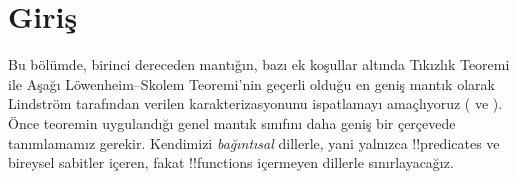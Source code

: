 \documentclass[../../../include/open-logic-section]{subfiles}
\begin{document}
\section{Giriş}

Bu bölümde, birinci dereceden mantığın, bazı ek koşullar altında Tıkızlık
Teoremi ile Aşağı L\"owenheim--Skolem Teoremi'nin geçerli olduğu en geniş
mantık olarak Lindstr\"om tarafından verilen karakterizasyonunu ispatlamayı
amaçlıyoruz ( ve
). Önce teoremin uygulandığı genel
mantık sınıfını daha geniş bir çerçevede tanımlamamız gerekir. Kendimizi
\emph{bağıntısal} dillerle, yani yalnızca !!{predicate}s ve bireysel sabitler
içeren, fakat !!{function}s içermeyen dillerle sınırlayacağız.
\end{document}
